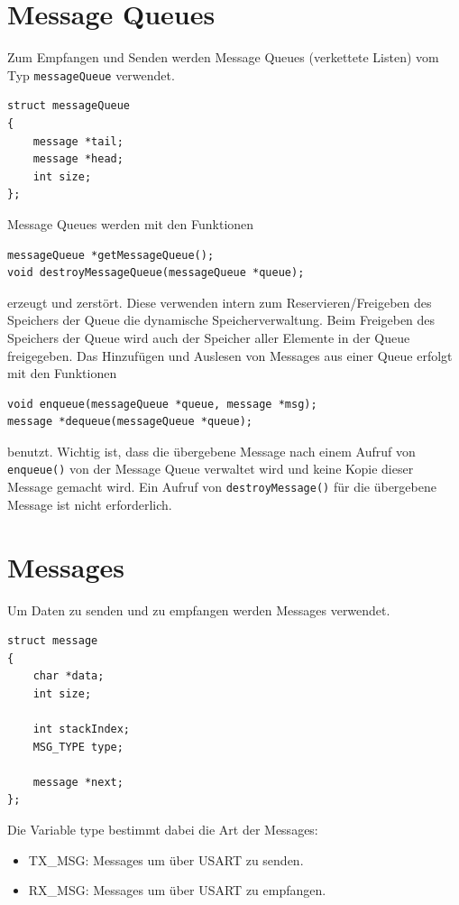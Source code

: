 \documentclass[fontsize=12pt, toc=bibliography, notitlepage]{scrreprt}
\begin{document}
\section{Message Queues}
\label{subsec:shell-queue}
Zum Empfangen und Senden werden Message Queues (verkettete Listen) vom Typ \lstinline$messageQueue$ verwendet.

\begin{lstlisting}
struct messageQueue
{
	message *tail;
	message *head;
	int size;
};
\end{lstlisting}

Message Queues werden mit den Funktionen

\begin{lstlisting}
messageQueue *getMessageQueue();
void destroyMessageQueue(messageQueue *queue);
\end{lstlisting}

erzeugt und zerstört. Diese verwenden intern zum Reservieren/Freigeben des Speichers der Queue die dynamische Speicherverwaltung. Beim Freigeben des Speichers der Queue wird auch der Speicher aller Elemente in der Queue freigegeben. Das Hinzufügen und Auslesen von Messages aus einer Queue erfolgt mit den Funktionen

\begin{lstlisting}
void enqueue(messageQueue *queue, message *msg);
message *dequeue(messageQueue *queue);
\end{lstlisting}

benutzt. Wichtig ist, dass die übergebene Message nach einem Aufruf von \lstinline$enqueue()$ von der Message Queue verwaltet wird und keine Kopie dieser Message gemacht wird.  Ein Aufruf von \lstinline$destroyMessage()$ für die übergebene Message ist nicht erforderlich.

\section{Messages}
\label{subsec:shell-messages}
Um Daten zu senden und zu empfangen werden Messages verwendet.

\begin{lstlisting}
struct message
{
	char *data;
	int size;

	int stackIndex;
	MSG_TYPE type;

	message *next;
};
\end{lstlisting}

Die Variable type bestimmt dabei die Art der Messages:
\begin{itemize}
	\item TX\_MSG: Messages um über USART zu senden.
	\item RX\_MSG: Messages um über USART zu empfangen.
\end{itemize}
\end{document}
